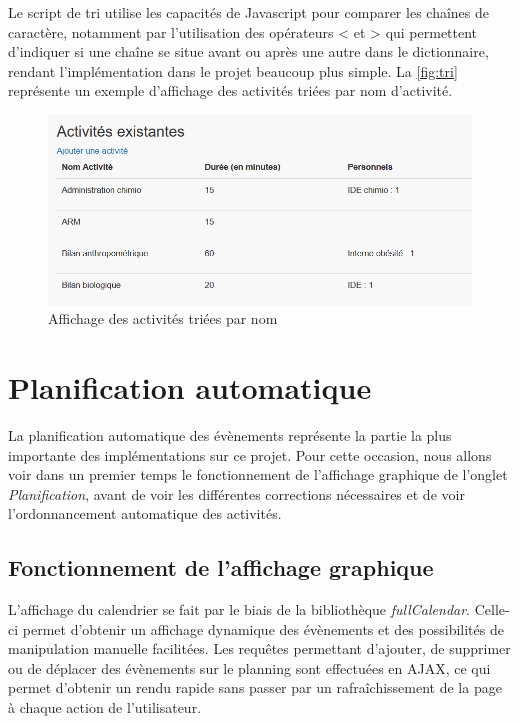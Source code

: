 \documentclass[noposter]{polytech/polytech}
\begin{document}
Le script de tri utilise les capacités de Javascript pour comparer les chaînes de caractère, notamment par l'utilisation des opérateurs < et > qui permettent d'indiquer si une chaîne se situe avant ou après une autre dans le dictionnaire, rendant l'implémentation dans le projet beaucoup plus simple. La \autoref{fig:tri} représente un exemple d'affichage des activités triées par nom d'activité. 

\begin{figure}
	\includegraphics[scale=0.5]{images/tri}
	\caption{Affichage des activités triées par nom}
	\label{fig:tri}
\end{figure}

\section{Planification automatique}

La planification automatique des évènements représente la partie la plus importante des implémentations sur ce projet. Pour cette occasion, nous allons voir dans un premier temps le fonctionnement de l'affichage graphique de l'onglet \textit{Planification}, avant de voir les différentes corrections nécessaires et de voir l'ordonnancement automatique des activités.

\subsection{Fonctionnement de l'affichage graphique}

L'affichage du calendrier se fait par le biais de la bibliothèque \textit{fullCalendar}. Celle-ci permet d'obtenir un affichage dynamique des évènements et des possibilités de manipulation manuelle facilitées. Les requêtes permettant d'ajouter, de supprimer ou de déplacer des évènements sur le planning sont effectuées en AJAX, ce qui permet d'obtenir un rendu rapide sans passer par un rafraîchissement de la page à chaque action de l'utilisateur. 
\end{document}
